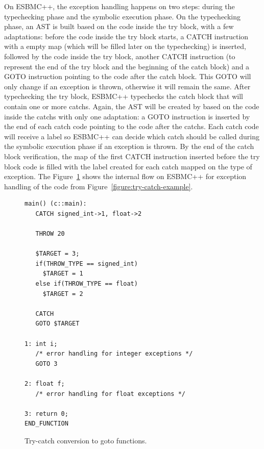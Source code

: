 \documentclass[a4paper]{llncs}
\begin{document}
On ESBMC++, the exception handling happens on two steps:
during the typechecking phase and the symbolic execution phase.
On the typechecking phase, an AST is built based on the code
inside the try block, with a few adaptations: before the code
inside the try block starts, a CATCH instruction with a empty map
(which will be filled later on the typechecking) is inserted, followed by
the code inside the try block, another CATCH instruction
(to represent the end of the try block and the beginning of the
catch block) and a GOTO instruction pointing to the code after
the catch block. This GOTO will only change if an exception is thrown,
otherwise it will remain the same. After typechecking the try block,
ESBMC++ typechecks the catch block that will contain one or more catchs.
Again, the AST will be created by based on the code inside the catchs
with only one adaptation: a GOTO instruction is inserted by the end of
each catch code pointing to the code after the catchs. Each catch code
will receive a label so ESBMC++ can decide which catch should be called
during the symbolic execution phase if an exception is thrown. By the end
of the catch block verification, the map of the first CATCH instruction
inserted before the try block code is filled with the label created
for each catch mapped on the type of exception. The Figure~\ref{figure:try-catch-goto}
shows the internal flow on ESBMC++ for exception handling of the code from
Figure~\ref{figure:try-catch-example}.

\begin{figure}[ht]
\centering
\begin{minipage}{1.0\textwidth}
\begin{lstlisting}
main() (c::main):
   CATCH signed_int->1, float->2

   THROW 20

   $TARGET = 3;
   if(THROW_TYPE == signed_int)
     $TARGET = 1
   else if(THROW_TYPE == float)
     $TARGET = 2

   CATCH
   GOTO $TARGET

1: int i;
   /* error handling for integer exceptions */
   GOTO 3

2: float f;
   /* error handling for float exceptions */

3: return 0;
END_FUNCTION
\end{lstlisting}
\end{minipage}
\caption{Try-catch conversion to goto functions.}
\label{figure:try-catch-goto}
\end{figure}
\end{document}
